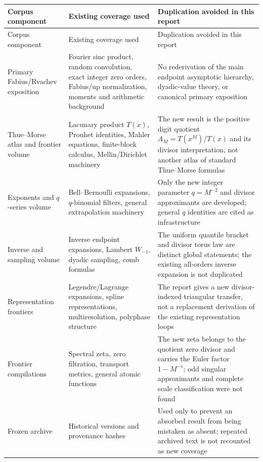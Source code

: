\documentclass[11pt,oneside]{article}
\theoremstyle{definition}
\theoremstyle{remark}
\begin{document}
\begin{longtable}{@{}>{\raggedright\arraybackslash}p{}>{\raggedright\arraybackslash}p{}>{\raggedright\arraybackslash}p{}@{}}
\toprule
Corpus component & Existing coverage used & Duplication avoided in this report\\
\midrule
\endfirsthead
\toprule
Corpus component & Existing coverage used & Duplication avoided in this report\\
\midrule
\endhead
Primary Fabius/Rvachev exposition & Fourier sinc product, random convolution, exact integer zero orders, Fabius/up normalization, moments and arithmetic background & No rederivation of the main endpoint asymptotic hierarchy, dyadic-value theory, or canonical primary exposition\\
\addlinespace
Thue--Morse atlas and frontier volume & Lacunary product $T(x)$, Prouhet identities, Mahler equations, finite-block calculus, Mellin/Dirichlet machinery & The new result is the positive digit quotient $A_M=T(x^M)/T(x)$ and its divisor interpretation, not another atlas of standard Thue--Morse formulas\\
\addlinespace
Exponents and $q$-series volume & Bell--Bernoulli expansions, $q$-binomial filters, general extrapolation machinery & Only the new integer parameter $q=M^{-2}$ and divisor approximants are developed; general $q$ identities are cited as infrastructure\\
\addlinespace
Inverse and sampling volume & Inverse endpoint expansions, Lambert $W_{-1}$, dyadic sampling, comb formulas & The uniform quantile bracket and divisor torus law are distinct global statements; the existing all-orders inverse expansion is not duplicated\\
\addlinespace
Representation frontiers & Legendre/Lagrange expansions, spline representations, multiresolution, polyphase structure & The report gives a new divisor-indexed triangular transfer, not a replacement derivation of the existing representation loops\\
\addlinespace
Frontier compilations & Spectral zeta, zero filtration, transport metrics, general atomic functions & The new zeta belongs to the quotient zero divisor and carries the Euler factor $1-M^{-s}$; odd singular approximants and complete scale classification were not found\\
\addlinespace
Frozen archive & Historical versions and provenance hashes & Used only to prevent an absorbed result from being mistaken as absent; repeated archived text is not recounted as new coverage\\
\bottomrule
\end{longtable}
\end{document}
